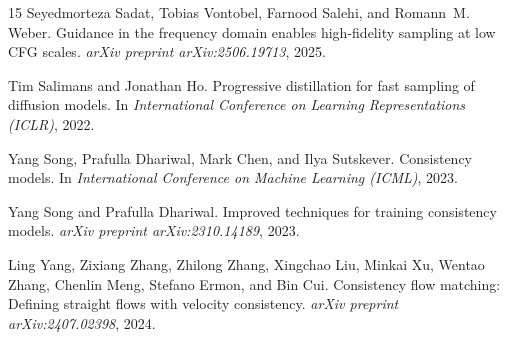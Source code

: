 \documentclass{article}
\begin{document}
\begin{thebibliography}{15}
Seyedmorteza Sadat, Tobias Vontobel, Farnood Salehi, and Romann~M. Weber.
\newblock Guidance in the frequency domain enables high-fidelity sampling at low {CFG} scales.
\newblock \emph{arXiv preprint arXiv:2506.19713}, 2025.

Tim Salimans and Jonathan Ho.
\newblock Progressive distillation for fast sampling of diffusion models.
\newblock In \emph{International Conference on Learning Representations (ICLR)}, 2022.

Yang Song, Prafulla Dhariwal, Mark Chen, and Ilya Sutskever.
\newblock Consistency models.
\newblock In \emph{International Conference on Machine Learning (ICML)}, 2023.

Yang Song and Prafulla Dhariwal.
\newblock Improved techniques for training consistency models.
\newblock \emph{arXiv preprint arXiv:2310.14189}, 2023.

Ling Yang, Zixiang Zhang, Zhilong Zhang, Xingchao Liu, Minkai Xu, Wentao Zhang, Chenlin Meng, Stefano Ermon, and Bin Cui.
\newblock Consistency flow matching: Defining straight flows with velocity consistency.
\newblock \emph{arXiv preprint arXiv:2407.02398}, 2024.

\end{thebibliography}
\end{document}
